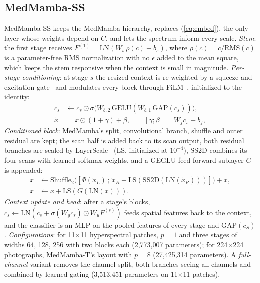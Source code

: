 \documentclass{svproc}
\begin{document}
\subsection{MedMamba-SS}\label{sec:ss}
MedMamba-SS keeps the MedMamba hierarchy, replaces (\ref{eq:embed}), the only layer whose weights depend on $C$, and lets the spectrum inform every scale. \emph{Stem}: the first stage receives $F^{(1)} = \mathrm{LN}(W_s\, \rho(c) + b_s)$, where $\rho(c) = c/\mathrm{RMS}(c)$ is a parameter-free RMS normalization with no $\epsilon$ added to the mean square, which keeps the stem responsive when the context is small in magnitude. \emph{Per-stage conditioning}: at stage $s$ the resized context is re-weighted by a squeeze-and-excitation gate~\cite{senet} and modulates every block through FiLM~\cite{film}, initialized to the identity:
\begin{equation}
\begin{split}
c_s &\leftarrow c_s \odot \sigma\big(W_{b,2}\,\mathrm{GELU}(W_{b,1}\,\mathrm{GAP}(c_s))\big), \\
\tilde{x} &= x \odot (1 + \gamma) + \beta, \qquad [\gamma ; \beta] = W_f c_s + b_f,
\end{split}
\label{eq:film}
\end{equation}
\emph{Conditioned block}: MedMamba's split, convolutional branch, shuffle and outer residual are kept; the scan half is added back to its scan output, both residual branches are scaled by LayerScale~\cite{layerscale} (LS, initialized at $10^{-4}$), SS2D combines its four scans with learned softmax weights, and a GEGLU feed-forward sublayer $G$~\cite{glu} is appended:
\begin{equation}
\begin{split}
x &\leftarrow \mathrm{Shuffle}_2\big([\Phi(\tilde{x}_L) \,;\, \tilde{x}_R + \mathrm{LS}(\mathrm{SS2D}(\mathrm{LN}(\tilde{x}_R)))]\big) + x,\\
x &\leftarrow x + \mathrm{LS}(G(\mathrm{LN}(x))).
\end{split}
\label{eq:block}
\end{equation}
\emph{Context update and head}: after a stage's blocks, $c_s \leftarrow \mathrm{LN}(c_s + \sigma(W_g c_s) \odot W_u F^{(s)})$ feeds spatial features back to the context, and the classifier is an MLP on the pooled features of every stage and $\mathrm{GAP}(c_S)$. \emph{Configurations}: for 11$\times$11 hyperspectral patches, $p=1$ and three stages of widths 64, 128, 256 with two blocks each (2,773,007 parameters); for 224$\times$224 photographs, MedMamba-T's layout with $p=8$ (27,425,314 parameters). A \emph{full-channel} variant removes the channel split, both branches seeing all channels and combined by learned gating (3,513,451 parameters on 11$\times$11 patches).
\end{document}
